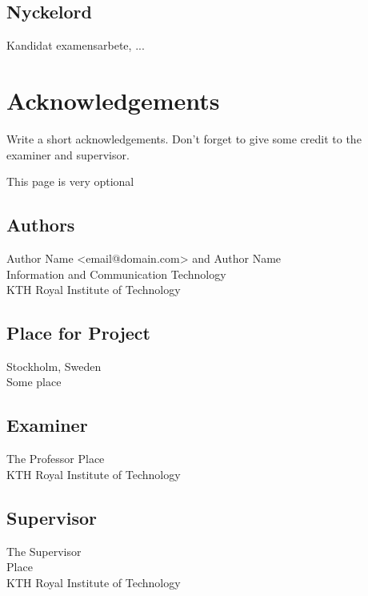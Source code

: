 \subsection*{Nyckelord}
Kandidat examensarbete, ...


\newpage
\section*{Acknowledgements}
Write a short acknowledgements. Don't forget to give some credit to the examiner and supervisor.






\newpage
\thispagestyle{empty}
This page is very optional
~\\
\vfill
{ 
	\subsection*{Authors}
	Author Name <email@domain.com> and Author Name\\
	Information and Communication Technology\\
	KTH Royal Institute of Technology
	
	\subsection*{Place for Project}
	Stockholm, Sweden\\
	Some place
	
	\subsection*{Examiner}
	The Professor
	Place \\
	KTH Royal Institute of Technology
	
	\subsection*{Supervisor }
	The Supervisor\\
	Place\\
	KTH Royal Institute of Technology
	~
	
}


